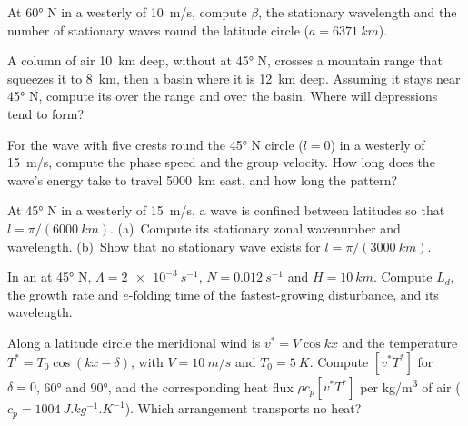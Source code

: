 \begin{exercise}[$\star$]\label{exo:b3:atmospheric-dynamics:4}
At \ang{60} N in a westerly of \qty{10}{m/s}, compute $\beta$, the
stationary wavelength and the number of stationary waves round the
latitude circle ($a = \qty{6371}{km}$).
\end{exercise}

\begin{exercise}[$\star\star$]\label{exo:b3:atmospheric-dynamics:5}
A column of air \qty{10}{km} deep, without  at \ang{45}
N, crosses a mountain range that squeezes it to \qty{8}{km}, then a basin
where it is \qty{12}{km} deep. Assuming it stays near \ang{45} N, compute its
 over the range and over the basin. Where will
depressions tend to form?
\end{exercise}

\begin{exercise}[$\star\star$]\label{exo:b3:atmospheric-dynamics:6}
For the wave with five crests round the \ang{45} N circle ($l = 0$) in a
westerly of \qty{15}{m/s}, compute the phase speed and the group velocity.
How long does the wave's energy take to travel \qty{5000}{km} east, and how
long the pattern?
\end{exercise}

\begin{exercise}[$\star\star$]\label{exo:b3:atmospheric-dynamics:7}
At \ang{45} N in a westerly of \qty{15}{m/s}, a wave is confined between
latitudes so that $l = \pi/(\qty{6000}{km})$. (a)~Compute its stationary
zonal wavenumber and wavelength. (b)~Show that no stationary wave exists for
$l = \pi/(\qty{3000}{km})$.
\end{exercise}

\begin{exercise}[$\star\star$]\label{exo:b3:atmospheric-dynamics:8}
In an  at \ang{45} N, $\Lambda = \qty{2e-3}{s^{-1}}$, $N =
\qty{0.012}{s^{-1}}$ and $H = \qty{10}{km}$. Compute $L_d$, the growth rate
and $e$-folding time of the fastest-growing disturbance, and its
wavelength.
\end{exercise}

\begin{exercise}[$\star\star$]\label{exo:b3:atmospheric-dynamics:9}
Along a latitude circle the  meridional wind is $v^* = V\cos kx$ and the
 temperature $T^* = T_0\cos(kx - \delta)$, with $V = \qty{10}{m/s}$ and
$T_0 = \qty{5}{K}$. Compute $[v^*T^*]$ for $\delta = 0$, \ang{60} and
\ang{90}, and the corresponding heat flux $\rho c_p[v^*T^*]$ per
\unit{kg/m^3} of air ($c_p = \qty{1004}{J.kg^{-1}.K^{-1}}$). Which
arrangement transports no heat?
\end{exercise}


